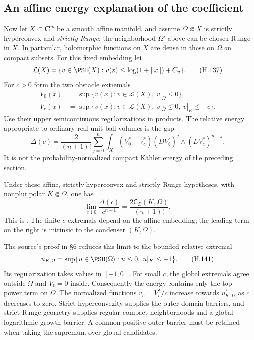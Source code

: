 \subsection{An affine energy explanation of the coefficient}

Now let $X\subset\mathbf C^m$ be a smooth affine manifold,
and assume $\Omega\Subset X$ is strictly hyperconvex and
\emph{strictly Runge}: the neighborhood $\Omega'$ above can
be chosen Runge in $X$. In particular, holomorphic functions
on $X$ are dense in those on $\Omega$ on compact subsets.
For this fixed embedding let
\[
 \mathcal L(X)
 =\{v\in\PSH(X):v(x)\leq\log(1+\|x\|)+C_v\}.
 \tag{H.137}\label{eq:appH-holomorphic-Lelong-class}
\]
For $c>0$ form the two obstacle extremals
\[
\begin{aligned}
 V_0(x)&=\sup\{v(x):v\in\mathcal L(X),\
                       v|_{\overline\Omega}\leq0\},\\
 V_c(x)&=\sup\{v(x):v\in\mathcal L(X),\
            v|_{\overline\Omega}\leq0,\ v|_K\leq-c\}.
\end{aligned}
 \tag{H.138}\label{eq:appH-holomorphic-obstacles}
\]
Use their upper semicontinuous regularizations in products.
The relative energy appropriate to ordinary real unit-ball
volumes is the gap
\[
 \Delta(c)=\frac{2}{(n+1)!}\sum_{j=0}^n
    \int_X(V_0^*-V_c^*)
          (DV_0^*)^j\wedge(DV_c^*)^{n-j}.
 \tag{H.139}\label{eq:appH-holomorphic-energy-gap}
\]
It is not the probability-normalized compact K\"ahler energy
of the preceding section.

\begin{samepage}
\begin{theorem}\label{thm:appH-holomorphic-small-obstacle}
Under these affine, strictly hyperconvex and strictly Runge
hypotheses, with nonpluripolar $K\Subset\Omega$, one has
\[
 \lim_{c\downarrow0}\frac{\Delta(c)}{c^{n+1}}
       =\frac{2\mathsf C_D(K,\Omega)}{(n+1)!}.
 \tag{H.140}\label{eq:appH-holomorphic-small-obstacle}
\]
This is \cite[Theorem~1.3]{Finski26HolomorphicEntropyV1}.
The finite-$c$ extremals depend on the affine embedding; the
leading term on the right is intrinsic to the condenser
$(K,\Omega)$.
\end{theorem}
\end{samepage}

The source's proof in \S6 reduces this limit to the bounded
relative extremal
\[
 u_{K,\Omega}=\sup\{u\in\PSH(\Omega):u\leq0,\ u|_K\leq-1\}.
 \tag{H.141}\label{eq:appH-holomorphic-relative-extremal}
\]
Its regularization takes values in $[-1,0]$. For small $c$,
the global extremals agree outside $\Omega$ and $V_0=0$
inside. Consequently the energy contains only the top-power
term on $\Omega$. The normalized functions $u_c=V_c^*/c$
increase towards $u_{K,\Omega}^*$ as $c$ decreases to zero.
Strict hyperconvexity supplies the outer-domain barriers, and
strict Runge geometry supplies regular compact neighborhoods
and a global logarithmic-growth barrier. A common positive
outer barrier must be retained when taking the supremum over
global candidates.

